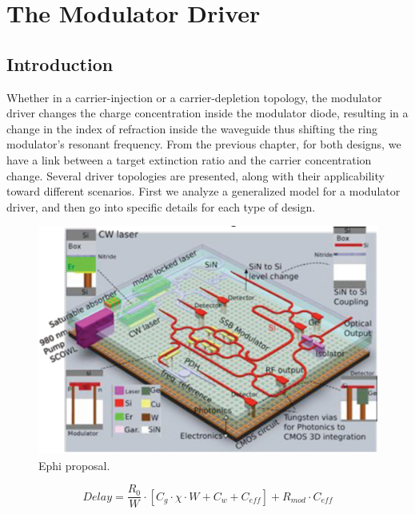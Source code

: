 
\chapter{The Modulator Driver}

\section{Introduction}

Whether in a carrier-injection or a carrier-depletion topology, the modulator driver changes the charge concentration inside the modulator diode, resulting in a change in the index of refraction inside the waveguide thus shifting the ring modulator's resonant frequency.  From the previous chapter, for both designs, we have a link between a target extinction ratio and the carrier concentration change.  Several driver topologies are presented, along with their applicability toward different scenarios.  First we analyze a generalized model for a modulator driver, and then go into specific details for each type of design.

\begin{figure}[H]
		\begin{center}
		\includegraphics[width=13cm]{figures/ephi_proposal.png} 
		\caption{\label{fig:electrical_model}Ephi proposal.}	
		\end{center}
    \vspace{-10pt}
\end{figure}

	\begin{equation}
Delay = \frac{R_0}{W} \cdot \left[C_g \cdot \chi \cdot W + C_w + C_{eff} \right] + R_{mod} \cdot C_{eff}
	\label{eqn:delay}
	\end{equation}	
	
